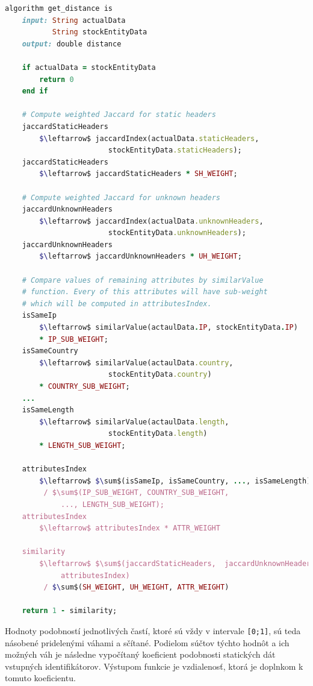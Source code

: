 \documentclass[
  digital, %
  oneside, %
  table,   %
  lof,     %
  nolot,   %
  nocover
]{fithesis3}
\begin{document}
\vspace{6mm}
\begin{lstlisting}[basicstyle=\footnotesize, language=Ruby, mathescape=true]
algorithm get_distance is
    input: String actualData
           String stockEntityData
    output: double distance

    if actualData = stockEntityData
        return 0
    end if

    # Compute weighted Jaccard for static headers
    jaccardStaticHeaders 
    	$\leftarrow$ jaccardIndex(actualData.staticHeaders, 
    	                stockEntityData.staticHeaders);
    jaccardStaticHeaders 
    	$\leftarrow$ jaccardStaticHeaders * SH_WEIGHT;

    # Compute weighted Jaccard for unknown headers
    jaccardUnknownHeaders 
    	$\leftarrow$ jaccardIndex(actualData.unknownHeaders,
    	                stockEntityData.unknownHeaders);
    jaccardUnknownHeaders 
    	$\leftarrow$ jaccardUnknownHeaders * UH_WEIGHT;

    # Compare values of remaining attributes by similarValue
    # function. Every of this attributes will have sub-weight
    # which will be computed in attributesIndex.
    isSameIp 
    	$\leftarrow$ similarValue(actaulData.IP, stockEntityData.IP)
    	* IP_SUB_WEIGHT;
    isSameCountry 
    	$\leftarrow$ similarValue(actaulData.country, 
    	                stockEntityData.country)
    	* COUNTRY_SUB_WEIGHT;
    ...
    isSameLength 
    	$\leftarrow$ similarValue(actaulData.length, 
    	                stockEntityData.length)
    	* LENGTH_SUB_WEIGHT;

    attributesIndex 
    	$\leftarrow$ $\sum$(isSameIp, isSameCountry, ..., isSameLength) 
    	 / $\sum$(IP_SUB_WEIGHT, COUNTRY_SUB_WEIGHT,
    	     ..., LENGTH_SUB_WEIGHT);
    attributesIndex 
    	$\leftarrow$ attributesIndex * ATTR_WEIGHT

    similarity 
    	$\leftarrow$ $\sum$(jaccardStaticHeaders,  jaccardUnknownHeaders,
    	     attributesIndex) 
    	 / $\sum$(SH_WEIGHT, UH_WEIGHT, ATTR_WEIGHT)

    return 1 - similarity;
\end{lstlisting}

Hodnoty podobností jednotlivých častí, ktoré sú vždy v intervale \texttt{[0;1]}, sú teda násobené pridelenými váhami a
sčítané. Podielom súčtov týchto hodnôt a ich možných váh je následne vypočítaný
koeficient podobnosti statických dát vstupných identifikátorov. Výstupom 
funkcie je vzdialenosť, ktorá je doplnkom k tomuto koeficientu.
\end{document}
